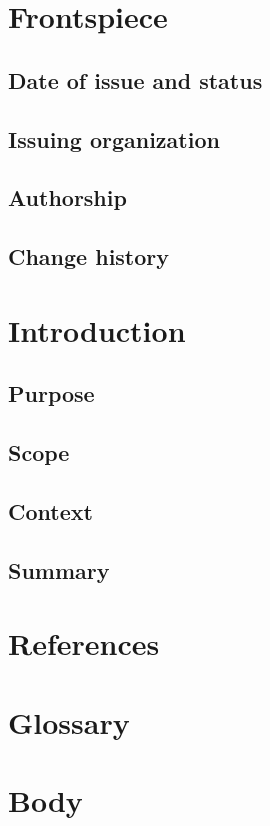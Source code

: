 \documentclass[letterpaper,10pt,serif, draftclsnofoot,onecolumn, compsoc, titlepage]{IEEEtran}
\begin{document}
\section{Frontspiece}
\subsection{Date of issue and status}
\subsection{Issuing organization}
\subsection{Authorship}

\subsection{Change history}

\section{Introduction}
\subsection{Purpose}
\subsection{Scope}
\subsection{Context}
\subsection{Summary}

\section{References}

\section{Glossary}

\section{Body}
\end{document}
